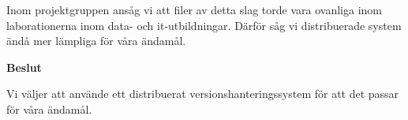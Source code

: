 Inom projektgruppen ansåg vi att filer av detta slag torde vara ovanliga inom laborationerna inom data- och it-utbildningar. Därför såg vi  distribuerade system ändå mer lämpliga för våra ändamål.
\begin{flushright}
  
  \textbf{Beslut}
  
  Vi väljer att använde ett distribuerat versionshanteringssystem för att det passar för våra ändamål.
  
\end{flushright}

